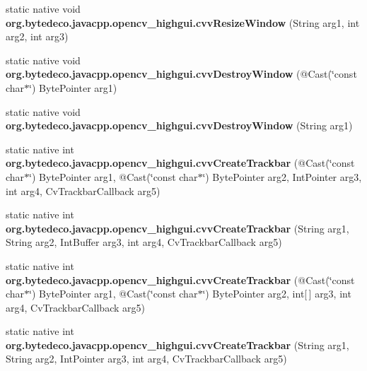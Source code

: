 \begin{DoxyCompactItemize}
\item 
\mbox{\label{group__highgui__c_ga58f0b6b6d4c23dda0a42ed783ab2d89a}} 
static native void {\bfseries org.\+bytedeco.\+javacpp.\+opencv\+\_\+highgui.\+cvv\+Resize\+Window} (String arg1, int arg2, int arg3)
\item 
\mbox{\label{group__highgui__c_gabe50ef497ef81c4fdd2699154ca073ed}} 
static native void {\bfseries org.\+bytedeco.\+javacpp.\+opencv\+\_\+highgui.\+cvv\+Destroy\+Window} (@Cast(\char`\"{}const char$\ast$\char`\"{}) Byte\+Pointer arg1)
\item 
\mbox{\label{group__highgui__c_gaacf3b0e2bb7c8cb2b901c330c953abbc}} 
static native void {\bfseries org.\+bytedeco.\+javacpp.\+opencv\+\_\+highgui.\+cvv\+Destroy\+Window} (String arg1)
\item 
\mbox{\label{group__highgui__c_ga426f8f7d205a46509f8cc62d03e1e1b4}} 
static native int {\bfseries org.\+bytedeco.\+javacpp.\+opencv\+\_\+highgui.\+cvv\+Create\+Trackbar} (@Cast(\char`\"{}const char$\ast$\char`\"{}) Byte\+Pointer arg1, @Cast(\char`\"{}const char$\ast$\char`\"{}) Byte\+Pointer arg2, Int\+Pointer arg3, int arg4, Cv\+Trackbar\+Callback arg5)
\item 
\mbox{\label{group__highgui__c_ga1c834431f8cbc43a8113c7c9ed8a77a9}} 
static native int {\bfseries org.\+bytedeco.\+javacpp.\+opencv\+\_\+highgui.\+cvv\+Create\+Trackbar} (String arg1, String arg2, Int\+Buffer arg3, int arg4, Cv\+Trackbar\+Callback arg5)
\item 
\mbox{\label{group__highgui__c_ga9258d5926d56dbf723124dad35abe7b6}} 
static native int {\bfseries org.\+bytedeco.\+javacpp.\+opencv\+\_\+highgui.\+cvv\+Create\+Trackbar} (@Cast(\char`\"{}const char$\ast$\char`\"{}) Byte\+Pointer arg1, @Cast(\char`\"{}const char$\ast$\char`\"{}) Byte\+Pointer arg2, int\mbox{[}$\,$\mbox{]} arg3, int arg4, Cv\+Trackbar\+Callback arg5)
\item 
\mbox{\label{group__highgui__c_gafa7153afec4e4dd8884ca6d21118c5b7}} 
static native int {\bfseries org.\+bytedeco.\+javacpp.\+opencv\+\_\+highgui.\+cvv\+Create\+Trackbar} (String arg1, String arg2, Int\+Pointer arg3, int arg4, Cv\+Trackbar\+Callback arg5)

\end{DoxyCompactItemize}
